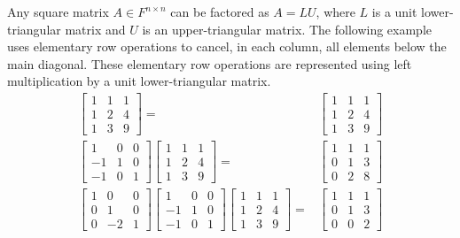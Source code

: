 Any square matrix $A \in F^{n \times n}$ can be factored as $A = LU$, where $L$ is a unit lower-triangular matrix and $U$ is an upper-triangular matrix.
The following example uses elementary row operations to cancel, in each column, all elements below the main diagonal.
These elementary row operations are represented using left multiplication by a unit lower-triangular matrix.
\begin{align*}
\begin{bmatrix} 1 & 1 & 1 \\ 1 & 2 & 4 \\ 1 & 3 & 9 \end{bmatrix}
= & \begin{bmatrix} 1 & 1 & 1 \\ 1 & 2 & 4 \\ 1 & 3 & 9 \end{bmatrix} \\
\begin{bmatrix} 1 & 0 & 0 \\ -1 & 1 & 0 \\ -1 & 0 & 1 \end{bmatrix}
\begin{bmatrix} 1 & 1 & 1 \\ 1 & 2 & 4 \\ 1 & 3 & 9 \end{bmatrix}
= & \begin{bmatrix} 1 & 1 & 1 \\ 0 & 1 & 3 \\ 0 & 2 & 8 \end{bmatrix} \\
\begin{bmatrix} 1 & 0 & 0 \\ 0 & 1 & 0 \\ 0 & -2 & 1 \end{bmatrix}
\begin{bmatrix} 1 & 0 & 0 \\ -1 & 1 & 0 \\ -1 & 0 & 1 \end{bmatrix}
\begin{bmatrix} 1 & 1 & 1 \\ 1 & 2 & 4 \\ 1 & 3 & 9 \end{bmatrix}
= & \begin{bmatrix} 1 & 1 & 1 \\ 0 & 1 & 3 \\ 0 & 0 & 2 \end{bmatrix}
\end{align*}

